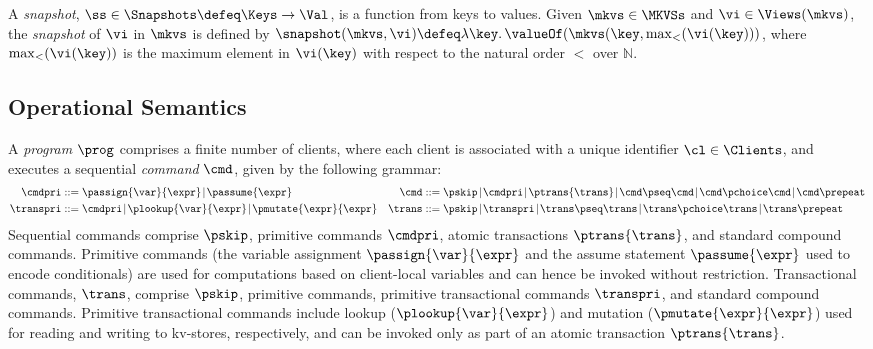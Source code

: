 \begin{definition}[Snapshots]
\label{def:heaps}
\label{def:snapshot}
A \emph{snapshot}, \( \ss \in \Snapshots  \defeq \Keys \to
\Val\),  is a function  from keys to values.
Given $\mkvs \in \MKVSs$ and $\vi \in \Views(\mkvs)$, the \emph{snapshot} of $\vi$ in 
$\mkvs$ is defined by  $\snapshot(\mkvs, \vi) \defeq \lambda \key \ldotp \valueOf(\mkvs(\key, \max_{<}(\vi(\key)))$, 
where $\max_{<}(\vi(\key))$ is the maximum element in $\vi(\key)$ with respect to the natural 
order $<$ over $\mathbb{N}$.
\end{definition}


\subsection{Operational Semantics}

A \emph{program} \( \prog \) comprises a finite number of clients,
where each client is associated with a unique identifier \( \cl \in \Clients \), 
and executes a sequential \emph{command} $\cmd$, given by the following grammar:%
%
{\small%
\begin{align*}
\cmdpri & ::=  
\passign{\var}{\expr} \!\mid\! 
\passume{\expr} 
&
\cmd & ::=  
\pskip \!\mid\!
\cmdpri \!\mid\!  
\ptrans{\trans} \!\mid\! 
\cmd \pseq \cmd \!\mid\! 
\cmd \pchoice \cmd \!\mid\! 
\cmd \prepeat  
\\
\transpri & ::= 
\cmdpri \!\mid\!
\plookup{\var}{\expr} \!\mid\!
\pmutate{\expr}{\expr} 
&
\trans & ::=
\pskip \!\mid\!
\transpri \!\mid\! 
\trans \pseq \trans \!\mid\!
\trans \pchoice \trans \!\mid\!
\trans\prepeat    
\end{align*}%
}%
%
%
Sequential commands  comprise $\pskip$,  primitive commands $\cmdpri
$, atomic transactions
$\ptrans{\trans}$,  and standard
compound commands. 
Primitive commands (the variable assignment
$\passign{\var}{\expr}$ and the assume statement $\passume{\expr}$
used to encode conditionals) are used for computations based on 
client-local variables 
and can hence be invoked without restriction. 
Transactional commands, $\trans$, 
comprise $\pskip$, primitive commands, 
primitive transactional commands $\transpri$,  and standard compound commands. 
Primitive transactional commands include lookup ($\plookup{\var}{\expr}$) and mutation 
($\pmutate{\expr}{\expr}$) used for reading and writing to kv-stores, respectively, and  
can be invoked only as part of an atomic transaction $\ptrans{\trans}$.

